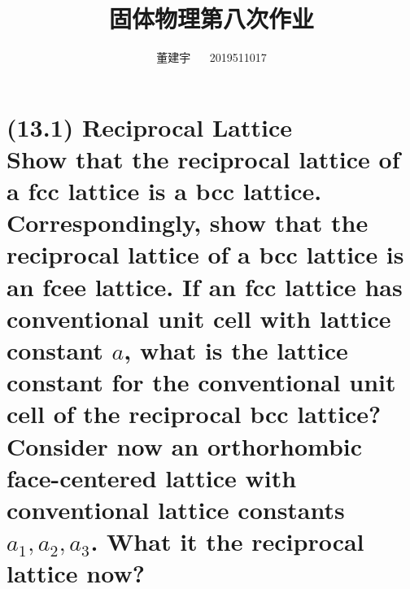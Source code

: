 \documentclass[reqno,a4paper,12pt]{amsart}
\title{固体物理第八次作业}
\author{董建宇 ~~ 2019511017}
\begin{document}
\maketitle
\titleformat{\section}[hang]{\small}{\thesection}{0.8em}{}{}
\titleformat{\subsection}[hang]{\small}{\thesubsection}{0.8em}{}{}

\section{\textbf{(13.1) Reciprocal Lattice}\\
Show that the reciprocal lattice of a fcc lattice is a bcc lattice. Correspondingly, show that the reciprocal lattice of a bcc lattice is an fcee lattice. If an fcc lattice has conventional unit cell with lattice constant $a$, what is the lattice constant for the conventional unit cell of the reciprocal bcc lattice? Consider now an orthorhombic face-centered lattice with conventional lattice constants $a_1, a_2, a_3$. What it the reciprocal lattice now?
}
\end{document}
